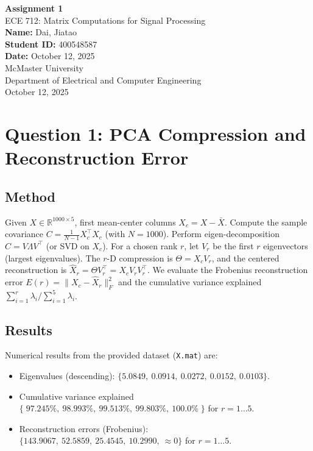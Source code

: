 \documentclass[12pt,a4paper]{article}
\newcommand{\coursename}{ECE 712: Matrix Computations for Signal Processing}
\newcommand{\assignmenttitle}{Assignment 1}
\newcommand{\studentname}{Dai, Jiatao}
\newcommand{\studentid}{400548587}
\newcommand{\duedate}{October 12, 2025}
\begin{document}
\begin{titlepage}
    \centering
    \vspace*{2cm}
    {\Huge \textbf{\assignmenttitle}}\\[1.5cm]
    {\Large \coursename}\\[1cm]
    \vspace{1cm}
    \textbf{Name:} \studentname \\[0.3cm]
    \textbf{Student ID:} \studentid \\[0.3cm]
    \textbf{Date:} \duedate \\[2cm]

    \vfill
    {\Large McMaster University \\[0.3cm]
    Department of Electrical and Computer Engineering \\[0.3cm]
    October 12, 2025}
\end{titlepage}

\tableofcontents
\newpage

\section{Question 1: PCA Compression and Reconstruction Error}

\subsection{Method}
Given $X\in\mathbb{R}^{1000\times 5}$, first mean-center columns $X_c=X-\bar X$. 
Compute the sample covariance $C=\frac{1}{N-1}X_c^\top X_c$ (with $N=1000$). 
Perform eigen-decomposition $C=V\Lambda V^\top$ (or SVD on $X_c$). 
For a chosen rank $r$, let $V_r$ be the first $r$ eigenvectors (largest eigenvalues). 
The $r$-D compression is $\Theta=X_c V_r$, and the centered reconstruction is $\hat X_r=\Theta V_r^\top=X_cV_rV_r^\top$. 
We evaluate the Frobenius reconstruction error $E(r)=\lVert X_c-\hat X_r\rVert_F^2$ and the cumulative variance explained $\sum_{i=1}^r\lambda_i / \sum_{i=1}^5\lambda_i$.

\subsection{Results}
Numerical results from the provided dataset (\texttt{X.mat}) are:
\begin{itemize}
    \item Eigenvalues (descending): $\{5.0849,\ 0.0914,\ 0.0272,\ 0.0152,\ 0.0103\}$.
    \item Cumulative variance explained $\{\;97.245\%,\ 98.993\%,\ 99.513\%,\ 99.803\%,\ 100.0\%\;\}$ for $r=1\ldots 5$.
    \item Reconstruction errors (Frobenius): $\{143.9067,\ 52.5859,\ 25.4545,\ 10.2990,\ \approx 0\}$ for $r=1\ldots 5$.
\end{itemize}
\end{document}
